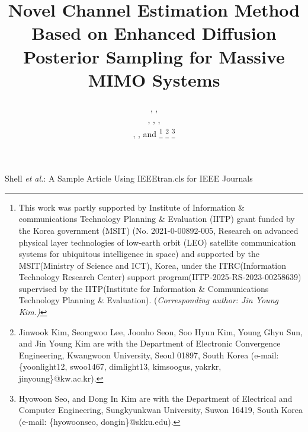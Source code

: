 \documentclass[lettersize,journal]{IEEEtran}
\begin{document}
\title{Novel Channel Estimation Method Based on Enhanced Diffusion Posterior Sampling for Massive MIMO Systems}

\author{,  ,

, , ,

, , and 
\thanks{This work was 
partly supported by Institute of Information \& communications Technology Planning \& Evaluation (IITP) grant funded by the Korea government (MSIT) (No. 2021-0-00892-005, Research on advanced physical layer technologies of low-earth orbit (LEO) satellite communication systems for ubiquitous intelligence in space) and 
supported by the MSIT(Ministry of Science and ICT), Korea, under the ITRC(Information Technology Research Center) support program(IITP-2025-RS-2023-00258639) supervised by the IITP(Institute for Information \& Communications Technology Planning \& Evaluation). (\it{Corresponding author: Jin Young Kim.})}%
\thanks{Jinwook Kim, Seongwoo Lee, Joonho Seon, Soo Hyun Kim, Young Ghyu Sun, and Jin Young Kim are with the Department of Electronic Convergence Engineering, Kwangwoon University, Seoul 01897, South Korea (e-mail: \{yoonlight12, swoo1467, dimlight13, kimsoogus, yakrkr, jinyoung\}@kw.ac.kr).}
\thanks{Hyowoon Seo, and Dong In Kim are with the Department of Electrical and Computer Engineering, Sungkyunkwan University, Suwon 16419, South Korea (e-mail: \{hyowoonseo, dongin\}@skku.edu).}}


%
{Shell \MakeLowercase{\textit{et al.}}: A Sample Article Using IEEEtran.cls for IEEE Journals}
\end{document}
